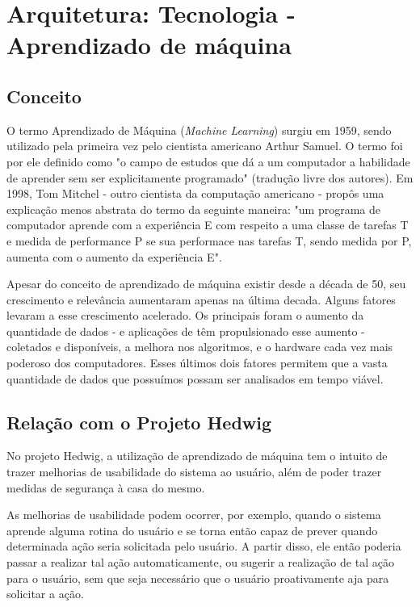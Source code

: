 \chapter{Arquitetura: Tecnologia - Aprendizado de máquina}

	\section{Conceito}
		O termo Aprendizado de Máquina (\emph{Machine Learning}) surgiu em 1959, sendo utilizado pela primeira vez  pelo cientista americano Arthur Samuel. O termo foi por ele definido como "o campo de estudos que dá a um computador a habilidade de aprender sem ser explicitamente programado" (tradução livre dos autores). Em 1998, Tom Mitchel - outro cientista da computação americano - propôs uma explicação menos abstrata do termo da seguinte maneira: "um programa de computador aprende com a experiência E com respeito a uma classe de tarefas T e medida de performance P se sua performace nas tarefas T, sendo medida por P, aumenta com o aumento da experiência E".

		Apesar do conceito de aprendizado de máquina existir desde a década de 50, seu crescimento e relevância aumentaram apenas na última decada. Alguns fatores levaram a esse crescimento acelerado. Os principais foram o aumento da quantidade de dados - e aplicações de \wiot têm propulsionado esse aumento - coletados e disponíveis, a melhora nos algoritmos, e o hardware cada vez mais poderoso dos computadores. Esses últimos dois fatores permitem que a vasta quantidade de dados que possuímos possam ser analisados em tempo viável.

	\section{Relação com o Projeto Hedwig}
		No projeto Hedwig, a utilização de aprendizado de máquina tem o intuito de trazer melhorias de usabilidade do sistema ao usuário, além de poder trazer medidas de segurança à casa do mesmo.

		As melhorias de usabilidade podem ocorrer, por exemplo, quando o sistema aprende alguma rotina do usuário e se torna então capaz de prever quando determinada ação seria solicitada pelo usuário. A partir disso, ele então poderia passar a realizar tal ação automaticamente, ou sugerir a realização de tal ação para o usuário, sem que seja necessário que o usuário proativamente aja para solicitar a ação.

